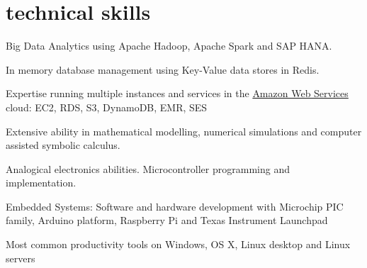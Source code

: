 \documentclass[]{friggeri-cv}
\begin{document}
\section{technical skills}
Big Data Analytics using Apache Hadoop, Apache Spark and SAP HANA. 

In memory database management using Key-Value data stores in Redis.
   
Expertise running multiple instances and services in the \href{http://aws.amazon.com/es/}{Amazon Web Services} cloud: EC2, RDS, S3, DynamoDB, EMR, SES

Extensive ability in mathematical modelling, numerical simulations and computer assisted symbolic calculus. 

Analogical electronics abilities. Microcontroller programming and implementation. 

Embedded Systems: Software and hardware development with Microchip PIC family, Arduino platform, Raspberry Pi and Texas Instrument Launchpad

   Most common productivity tools on Windows, OS X, Linux desktop and Linux servers
   
%
\newpage
\end{document}
